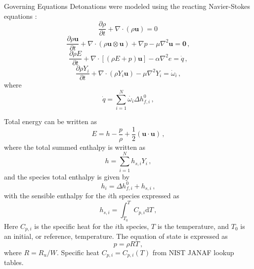 \begin{frame}[allowframebreaks]{Governing Equations}
Detonations were modeled using the reacting Navier-Stokes equations \cite{kuo,stokes}:
\begin{equation}
\frac{\partial \rho}{\partial t} + \nabla \cdot \left(\rho \bm{u}\right) = 0\,
\end{equation}
\begin{equation}
\frac{\partial \rho\bm{u}}{\partial t} + \nabla \cdot \left(\rho \bm{u}\otimes \bm{u}\right) + \nabla p -\mu\nabla^2\bm{u}= \bm{0}\,,
\end{equation}
\begin{equation}
\frac{\partial \rho E}{\partial t} + \nabla \cdot \left[\left(\rho E + p\right)\bm{u}\right] -\alpha\nabla^2 e = \dot{q}\,,
\end{equation}
\begin{equation}
\frac{\partial \rho Y_i}{\partial t} + \nabla \cdot \left(\rho Y_i \bm{u}\right) -\mu\nabla^2 Y_i= \dot{\omega}_i\,,
\end{equation}
where 
\begin{equation}
\dot{q} = \sum_{i = 1}^N \dot{\omega_i} \Delta h_{f,i}^0\,,
\end{equation}

Total energy \cite{kuo} can be written as 
\begin{equation}
E = h - \frac{p}{\rho} +\frac{1}{2} \left(\bm{u}\cdot\bm{u}\right)\,,
\end{equation}
where the total summed enthalpy is written \cite{kuo} as 
\begin{equation}
h = \sum_{i = 1}^Nh_{s,i}Y_i\,,
\end{equation}
and the species total enthalpy \cite{kuo} is given by 
\begin{equation}
h_{i} = \Delta h_{f,i}^0 + h_{s,i}\,,
\end{equation}
with the sensible enthalpy for the $i$th species expressed as
\begin{equation}
h_{s,i} = \int_{T_0}^T C_{p,i}\mathrm{d}T\,,
\end{equation}
Here $C_{p,i}$ is the specific heat for the $i$th species, $T$ is the temperature, and $T_0$ is an initial, or reference, temperature. The equation of state is expressed as 
\begin{equation}
p = \rho R T\,,
\end{equation}
where $R=R_u/W$. Specific heat $C_{p,i}=C_{p,i}(T)$ from NIST JANAF \cite{janaf} lookup tables.  
\end{frame}

